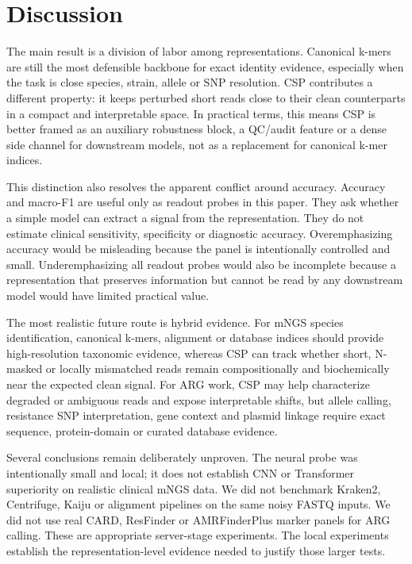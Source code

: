 \documentclass[10.5pt]{article}
\begin{document}
\section*{Discussion}

The main result is a division of labor among representations. Canonical k-mers are still the most defensible backbone for exact identity evidence, especially when the task is close species, strain, allele or SNP resolution. CSP contributes a different property: it keeps perturbed short reads close to their clean counterparts in a compact and interpretable space. In practical terms, this means CSP is better framed as an auxiliary robustness block, a QC/audit feature or a dense side channel for downstream models, not as a replacement for canonical k-mer indices.


This distinction also resolves the apparent conflict around accuracy. Accuracy and macro-F1 are useful only as readout probes in this paper. They ask whether a simple model can extract a signal from the representation. They do not estimate clinical sensitivity, specificity or diagnostic accuracy. Overemphasizing accuracy would be misleading because the panel is intentionally controlled and small. Underemphasizing all readout probes would also be incomplete because a representation that preserves information but cannot be read by any downstream model would have limited practical value.


The most realistic future route is hybrid evidence. For mNGS species identification, canonical k-mers, alignment or database indices should provide high-resolution taxonomic evidence, whereas CSP can track whether short, N-masked or locally mismatched reads remain compositionally and biochemically near the expected clean signal. For ARG work, CSP may help characterize degraded or ambiguous reads and expose interpretable shifts, but allele calling, resistance SNP interpretation, gene context and plasmid linkage require exact sequence, protein-domain or curated database evidence.


Several conclusions remain deliberately unproven. The neural probe was intentionally small and local; it does not establish CNN or Transformer superiority on realistic clinical mNGS data. We did not benchmark Kraken2, Centrifuge, Kaiju or alignment pipelines on the same noisy FASTQ inputs. We did not use real CARD, ResFinder or AMRFinderPlus marker panels for ARG calling. These are appropriate server-stage experiments. The local experiments establish the representation-level evidence needed to justify those larger tests.
\end{document}
